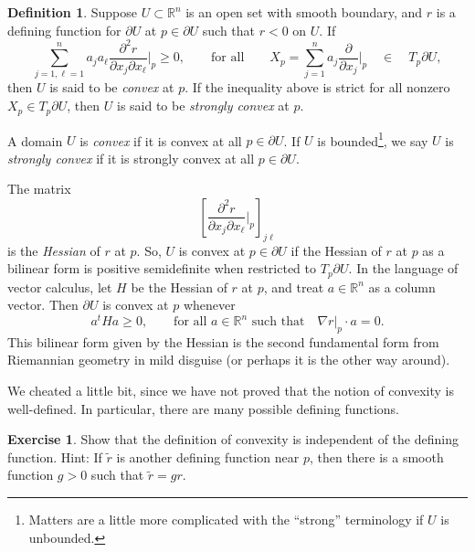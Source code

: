 \documentclass[12pt,openany]{book}
\newcommand{\R}{{\mathbb{R}}}
\newcommand{\myindex}[1]{#1\index{#1}}
\theoremstyle{plain}
\theoremstyle{remark}
\theoremstyle{definition}
\newtheorem{defn}[thm]{Definition}
\newenvironment{exbox}{%
    \def\FrameCommand{\vrule width 1pt \relax\hspace{10pt}}%
    \MakeFramed {\advance \hsize -\width \FrameRestore}%
}{%
    \endMakeFramed
}
\theoremstyle{exercise}
\newtheorem{exercise}{Exercise}[section]
\theoremstyle{example}
\begin{document}
\begin{defn}
Suppose $U \subset \R^n$ is an open set with
smooth boundary, %
and 
$r$ is a defining function for $\partial U$ at $p \in \partial
U$ such that $r < 0$ on $U$.
If
\begin{equation*}
\sum_{j=1,\ell=1}^n
a_j a_\ell \frac{\partial^2 r}{\partial x_j \partial x_\ell} \Big|_p \geq 0 ,
\qquad \text{for all} \qquad
X_p = \sum_{j=1}^n a_j 
\frac{\partial}{\partial x_j}\Big|_p \quad \in \quad T_p \partial U,
\end{equation*}
then $U$ is said to be \emph{\myindex{convex}} at $p$.  If the inequality
above is strict for all nonzero $X_p \in T_p \partial U$, then $U$ is said to be
\emph{\myindex{strongly convex}} at $p$.

A domain $U$ is \emph{convex} if it is convex at all $p \in \partial U$.
If $U$ is bounded\footnote{Matters are a little more complicated
with the ``strong'' terminology if $U$ is unbounded.}, we say
$U$ is \emph{strongly convex} if it is strongly convex at all $p \in
\partial U$.
\end{defn}

The matrix
\begin{equation*}
\left[ \frac{\partial^2 r}{\partial x_j \partial x_\ell} \Big|_p
\right]_{j\ell}
\end{equation*}
is the
\emph{\myindex{Hessian}} of $r$ at $p$.
So, $U$ is convex at $p \in \partial U$ if
the Hessian
of $r$ at $p$ as a bilinear form is positive semidefinite
when restricted to $T_p \partial U$.
In the language of vector calculus, let $H$ be the Hessian of $r$ at $p$, and treat
$a \in \R^n$ as a column vector.
Then 
$\partial U$ is convex at $p$ whenever
\begin{equation*}
a^t H a \geq 0 , \qquad \text{for all $a \in \R^n$ such that} \quad \nabla r|_p
\cdot a = 0 .
\end{equation*}
This bilinear form given by the Hessian is the second fundamental form from Riemannian
geometry in mild disguise (or perhaps it is the other way around).

We cheated a little bit, since we have not proved that
the notion of convexity is well-defined.  In particular, there are many possible
defining functions.

\begin{exbox}
\begin{exercise}
Show that the definition of convexity is independent of the defining
function.  Hint: If $\tilde{r}$ is another defining function near $p$,
then there is a smooth function $g > 0$ such that $\tilde{r} = g r$.
\end{exercise}
\end{exbox}
\end{document}
